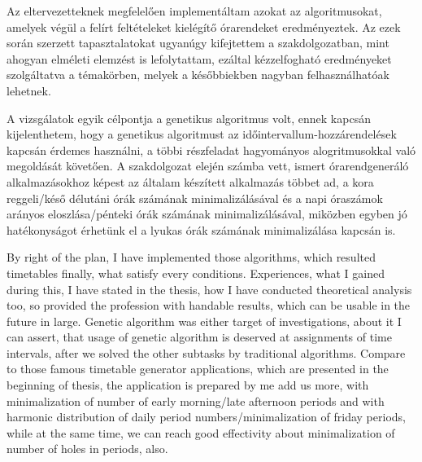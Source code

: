 
Az eltervezetteknek megfelelően implementáltam azokat az algoritmusokat, amelyek végül a felírt feltételeket kielégítő órarendeket eredményeztek. Az ezek során szerzett tapasztalatokat ugyanúgy kifejtettem a szakdolgozatban, mint ahogyan elméleti elemzést is lefolytattam, ezáltal kézzelfogható eredményeket szolgáltatva a témakörben, melyek a későbbiekben nagyban felhasználhatóak lehetnek.

A vizsgálatok egyik célpontja a genetikus algoritmus volt, ennek kapcsán kijelenthetem, hogy a genetikus algoritmust az időintervallum-hozzárendelések kapcsán érdemes használni, a többi részfeladat hagyományos alogritmusokkal való megoldását követően. A szakdolgozat elején számba vett, ismert órarendgeneráló alkalmazásokhoz képest az általam készített alkalmazás többet ad, a kora reggeli/késő délutáni órák számának minimalizálásával és a napi óraszámok arányos eloszlása/pénteki órák számának minimalizálásával, miközben egyben jó hatékonyságot érhetünk el a lyukas órák számának minimalizálása kapcsán is.

\newpage


\bigskip

By right of the plan, I have implemented those algorithms, which resulted timetables finally, what satisfy every conditions. Experiences, what I gained during this, I have stated in the thesis, how I have conducted theoretical analysis too, so provided the profession with handable results, which can be usable in the future in large. Genetic algorithm was either target of investigations, about it I can assert, that usage of genetic algorithm is deserved at assignments of time intervals, after we solved the other subtasks by traditional algorithms. Compare to those famous timetable generator applications, which are presented in the beginning of thesis, the application is prepared by me add us more, with minimalization of number of early morning/late afternoon periods and with harmonic distribution of daily period numbers/minimalization of friday periods, while at the same time, we can reach good effectivity about minimalization of number of holes in periods, also.

%
%
%
%
%
%
%
%
%
